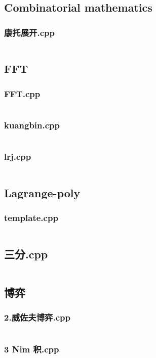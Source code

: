 \documentclass[a4paper,11pt]{article}
\begin{document}
\subsection{Combinatorial mathematics}
\subsubsection{康托展开.cpp}
\inputminted[breaklines]{c++}{"D:/tmplz/templates/数学/Combinatorial mathematics/康托展开.cpp"}
\subsection{FFT}
\subsubsection{FFT.cpp}
\inputminted[breaklines]{c++}{"D:/tmplz/templates/数学/FFT/FFT.cpp"}
\subsubsection{kuangbin.cpp}
\inputminted[breaklines]{c++}{"D:/tmplz/templates/数学/FFT/kuangbin.cpp"}
\subsubsection{lrj.cpp}
\inputminted[breaklines]{c++}{"D:/tmplz/templates/数学/FFT/lrj.cpp"}
\subsection{Lagrange-poly}
\subsubsection{template.cpp}
\inputminted[breaklines]{c++}{"D:/tmplz/templates/数学/Lagrange-poly/template.cpp"}
\subsection{三分.cpp}
\inputminted[breaklines]{c++}{"D:/tmplz/templates/数学/三分.cpp"}
\subsection{博弈}
\subsubsection{2.威佐夫博弈.cpp}
\inputminted[breaklines]{c++}{"D:/tmplz/templates/数学/博弈/2.威佐夫博弈.cpp"}
\subsubsection{3 Nim 积.cpp}
\inputminted[breaklines]{c++}{"D:/tmplz/templates/数学/博弈/3 Nim 积.cpp"}
\end{document}
